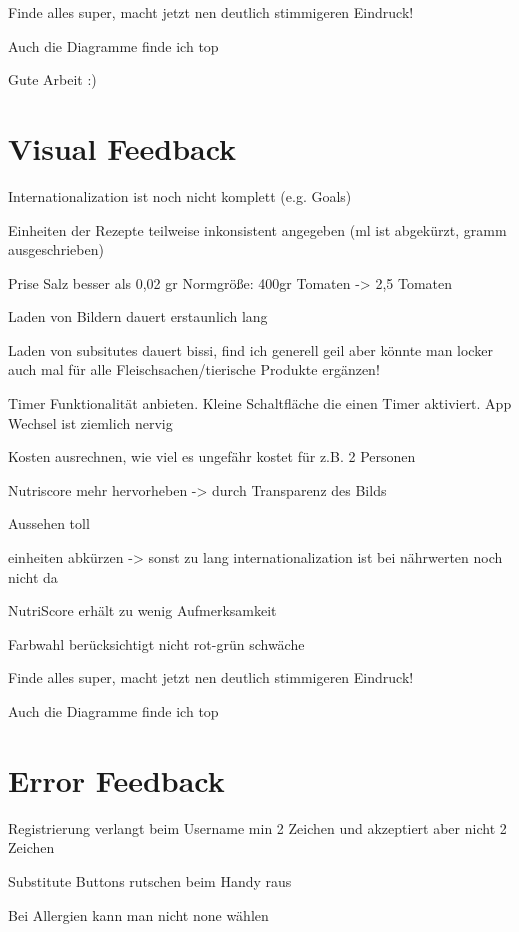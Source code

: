     Finde alles super, macht jetzt nen deutlich stimmigeren Eindruck! 
    
    Auch die Diagramme finde ich top
    
        Gute Arbeit  :)

\section{Visual Feedback}

Internationalization ist noch nicht komplett (e.g. Goals)

Einheiten der Rezepte teilweise inkonsistent angegeben (ml ist abgekürzt, gramm ausgeschrieben)

Prise Salz besser als 0,02 gr
    Normgröße: 400gr Tomaten -> 2,5 Tomaten

Laden von Bildern dauert erstaunlich lang

    Laden von subsitutes dauert bissi, find ich generell geil aber könnte man locker auch mal für alle Fleischsachen/tierische Produkte ergänzen! 
    
        Timer Funktionalität anbieten. Kleine Schaltfläche die einen Timer aktiviert. App Wechsel ist ziemlich nervig
        
        Kosten ausrechnen, wie viel es ungefähr kostet für z.B. 2 Personen
        
        Nutriscore mehr hervorheben -> durch Transparenz des Bilds
        
        Aussehen toll
        
        einheiten abkürzen -> sonst zu lang
internationalization ist bei nährwerten noch nicht da

NutriScore erhält zu wenig Aufmerksamkeit

Farbwahl berücksichtigt nicht rot-grün schwäche

    Finde alles super, macht jetzt nen deutlich stimmigeren Eindruck! 
    
    Auch die Diagramme finde ich top

\section{Error Feedback}

Registrierung verlangt beim Username min 2 Zeichen und akzeptiert aber nicht 2 Zeichen

Substitute Buttons rutschen beim Handy raus

Bei Allergien kann man nicht none wählen

